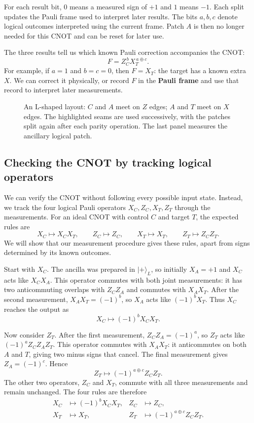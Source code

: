 \documentclass[11pt,a4paper]{article}
\newcommand{\ket}[1]{\lvert #1\rangle}
\begin{document}
For each result bit, $0$ means a measured sign of $+1$ and $1$ means $-1$. Each split updates the Pauli frame used to interpret later results. The bits $a,b,c$ denote logical outcomes interpreted using the current frame. Patch $A$ is then no longer needed for this CNOT and can be reset for later use.

The three results tell us which known Pauli correction accompanies the CNOT:
\[
F=Z_C^{\,b}X_T^{\,a\oplus c}.
\]
For example, if $a=1$ and $b=c=0$, then $F=X_T$: the target has a known extra $X$. We can correct it physically, or record $F$ in the \textbf{Pauli frame} and use that record to interpret later measurements.

\begin{figure}[!ht]
\centering\cnotpatches
\caption{An L-shaped layout: $C$ and $A$ meet on $Z$ edges; $A$ and $T$ meet on $X$ edges. The highlighted seams are used successively, with the patches split again after each parity operation. The last panel measures the ancillary logical patch.}
\end{figure}

\subsection{Checking the CNOT by tracking logical operators}

We can verify the CNOT without following every possible input state.
Instead, we track the four logical Pauli operators $X_C,Z_C,X_T,Z_T$ through the measurements.
For an ideal CNOT with control $C$ and target $T$, the expected rules are
\[
X_C\longmapsto X_CX_T,\qquad
Z_C\longmapsto Z_C,\qquad
X_T\longmapsto X_T,\qquad
Z_T\longmapsto Z_CZ_T.
\]
We will show that our measurement procedure gives these rules, apart from signs determined by its known outcomes.

Start with $X_C$. The ancilla was prepared in $\ket{+}_L$, so initially $X_A=+1$ and $X_C$ acts like $X_CX_A$. 
This operator commutes with both joint measurements: it has two anticommuting overlaps with $Z_CZ_A$ and commutes with $X_AX_T$. After the second measurement, $X_AX_T=(-1)^b$, so $X_A$ acts like $(-1)^bX_T$.
Thus $X_C$ reaches the output as
\[
X_C\longmapsto(-1)^bX_CX_T.
\]

Now consider $Z_T$. After the first measurement,
$Z_CZ_A=(-1)^a$, so $Z_T$ acts like
$(-1)^aZ_CZ_AZ_T$. This operator commutes with
$X_AX_T$: it anticommutes on both $A$ and $T$,
giving two minus signs that cancel. The final
measurement gives $Z_A=(-1)^c$. Hence
\[
Z_T\longmapsto(-1)^{a\oplus c}Z_CZ_T.
\]
The other two operators, $Z_C$ and $X_T$, commute
with all three measurements and remain unchanged.
The four rules are therefore
\[
\begin{aligned}
X_C&\longmapsto(-1)^bX_CX_T,
& Z_C&\longmapsto Z_C,\\
X_T&\longmapsto X_T,
& Z_T&\longmapsto(-1)^{a\oplus c}Z_CZ_T.
\end{aligned}
\]
\end{document}
